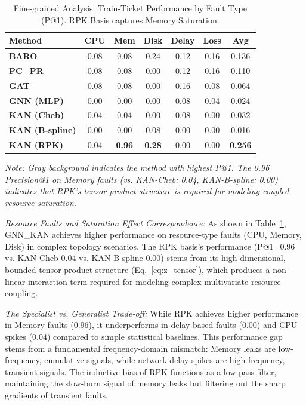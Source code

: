 \documentclass[conference]{IEEEtran}
\begin{document}
\begin{table}[htbp]
\centering
\caption{Fine-grained Analysis: Train-Ticket Performance by Fault Type (P@1). RPK Basis captures Memory Saturation.}
\label{tab:fault_type_analysis}
\footnotesize
\setlength{\tabcolsep}{2pt}
\begin{tabular}{l|ccccc|c}
\toprule
\textbf{Method} & \textbf{CPU} & \textbf{Mem} & \textbf{Disk} & \textbf{Delay} & \textbf{Loss} & \textbf{Avg} \\
\midrule
\textbf{BARO} & 0.08 & 0.08 & 0.24 & 0.12 & 0.16 & 0.136 \\
\textbf{PC\_PR} & 0.08 & 0.08 & 0.00 & 0.12 & 0.16 & 0.110 \\
\textbf{GAT} & 0.08 & 0.08 & 0.00 & 0.16 & 0.08 & 0.064 \\
\textbf{GNN (MLP)} & 0.00 & 0.00 & 0.00 & 0.08 & 0.04 & 0.024 \\
\midrule
\textbf{KAN (Cheb)} & 0.04 & 0.04 & 0.00 & 0.08 & 0.00 & 0.032 \\
\textbf{KAN (B-spline)} & 0.00 & 0.00 & 0.08 & 0.00 & 0.00 & 0.016 \\
\textbf{KAN (RPK)} & 0.04 & \cellcolor{gray!20}\textbf{0.96} & \cellcolor{gray!20}\textbf{0.28} & 0.00 & 0.00 & \cellcolor{gray!20}\textbf{0.256} \\
\bottomrule
\end{tabular}
\vspace{0.2cm}

\footnotesize \textit{Note: Gray background indicates the method with highest P@1. The 0.96 Precision@1 on Memory faults (vs. KAN-Cheb: 0.04, KAN-B-spline: 0.00) indicates that RPK's tensor-product structure is required for modeling coupled resource saturation.}
\end{table}

\textit{Resource Faults and Saturation Effect Correspondence:} As shown in Table~\ref{tab:fault_type_analysis}, GNN\_KAN achieves higher performance on resource-type faults (CPU, Memory, Disk) in complex topology scenarios. The RPK basis's performance (P@1=0.96 vs. KAN-Cheb 0.04 vs. KAN-B-spline 0.00) stems from its high-dimensional, bounded tensor-product structure (Eq.~\ref{eq:z_tensor}), which produces a non-linear interaction term required for modeling complex multivariate resource coupling.

\textit{The Specialist vs. Generalist Trade-off:} While RPK achieves higher performance in Memory faults (0.96), it underperforms in delay-based faults (0.00) and CPU spikes (0.04) compared to simple statistical baselines. This performance gap stems from a fundamental frequency-domain mismatch: Memory leaks are low-frequency, cumulative signals, while network delay spikes are high-frequency, transient signals. The inductive bias of RPK functions as a low-pass filter, maintaining the slow-burn signal of memory leaks but filtering out the sharp gradients of transient faults.
\end{document}
